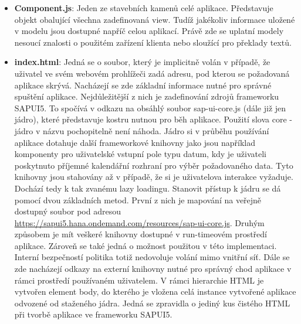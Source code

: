 \documentclass[thesis=M,czech]{FITthesis}[2012/06/26]
\begin{document}
\begin{itemize}
	\item
	\textbf{Component.js}: Jeden ze stavebních kamenů celé aplikace. Představuje objekt obalující všechna zadefinovaná view. Tudíž jakékoliv informace uložené v modelu jsou dostupné napříč celou aplikací. Právě zde se uplatní modely nesoucí znalosti o použitém zařízení klienta nebo sloužící pro překlady textů.
	\item
	\textbf{index.html}: Jedná se o soubor, který je implicitně volán v případě, že uživatel ve svém webovém prohlížeči zadá adresu, pod kterou se požadovaná aplikace skrývá. Nacházejí se zde základní informace nutné pro správné spuštění aplikace. Nejdůležitější z nich je zadefinování zdrojů frameworku SAPUI5. To spočívá v odkazu na obsáhlý soubor sap-ui-core.js (dále již jen jádro), které představuje kostru nutnou pro běh aplikace. Použití slova core - jádro v názvu pochopitelně není náhoda. Jádro si v průběhu používání aplikace dotahuje další frameworkové knihovny jako jsou například komponenty pro uživatelské vstupní pole typu datum, kdy je uživateli poskytnuto příjemné kalendářní rozhraní pro výběr požadovaného data. Tyto knihovny jsou stahovány až v případě, že si je uživatelova interakce vyžaduje. Dochází tedy k tak zvanému lazy loadingu. Stanovit přístup k jádru se dá pomocí dvou základních metod. První z nich je mapování na veřejně dostupný soubor pod adresou \url{https://sapui5.hana.ondemand.com/resources/sap-ui-core.js}. Druhým způsobem je mít veškeré knihovny dostupné v run-timeovém prostředí aplikace. Zároveň se také jedná o možnost použitou v této implementaci. Interní bezpečností politika totiž nedovoluje volání mimo vnitřní síť. Dále se zde nacházejí odkazy na externí knihovny nutné pro správný chod aplikace v rámci prostředí používaném uživatelem. V rámci hierarchie HTML je vytvořen element body, do kterého je vložena celá instance vytvořené aplikace odvozené od staženého jádra. Jedná se zpravidla o jediný kus čistého HTML při tvorbě aplikace ve frameworku SAPUI5.

\end{itemize}
\end{document}
